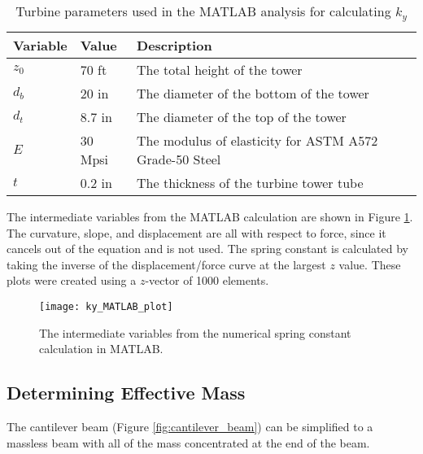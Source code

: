 \begin{table}[]
\caption{Turbine parameters used in the MATLAB analysis for calculating $k_y$}
\label{t:MATLAB_ky_variables}
\vspace*{0.2in}
\begin{tabular}{|m{1in}|m{1in}|m{4in}|}
\hline
\rowcolor[HTML]{EFEFEF} 
\textbf{Variable} & \textbf{Value} & \textbf{Description} \\ \hline
$z_0$ & 70 ft & The total height of the tower \\ \hline
$d_b$ & 20 in & The diameter of the bottom of the tower \\ \hline
$d_t$ & 8.7 in & The diameter of the top of the tower \\ \hline
$E$ & 30 Mpsi & The modulus of elasticity for ASTM A572 Grade-50 Steel \\ \hline
$t$ & 0.2 in & The thickness of the turbine tower tube \\ \hline
\end{tabular}
\end{table}

The intermediate variables from the MATLAB calculation are shown in Figure  \ref{fig:ky_MATLAB_plot}.  The curvature, slope, and displacement are all with respect to force, since it cancels out of the equation and is not used.  The spring constant is calculated by taking the inverse of the displacement/force curve at the largest $z$ value.  These plots were created using a $z$-vector of 1000 elements.

\begin{figure}
	\centering
	\texttt{[image: ky\_MATLAB\_plot]}
	\decoRule
	\caption{The intermediate variables from the numerical spring constant calculation in MATLAB.}
	\label{fig:ky_MATLAB_plot}
\end{figure}
\FloatBarrier



\subsection{Determining Effective Mass}
The cantilever beam (Figure \ref{fig:cantilever_beam}) can be simplified to a massless beam with all of the mass concentrated at the end of the beam.


